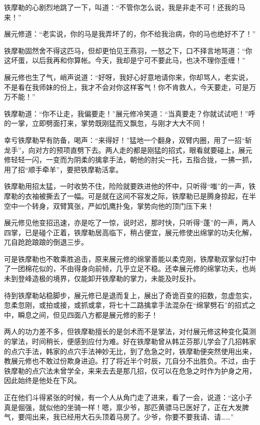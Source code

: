 \documentclass[12pt,oneside]{book}
\begin{document}
铁摩勒的心剧烈地跳了一下，叫道：``不管你怎么说，我是非走不可！还我的马来！''

展元修道：``老实说，你的马是我弄坏了的，你不给我治病，你的马也绝好不了！''

铁摩勒固然舍不得这匹马，但却更怕见王燕羽，一怒之下，口不择言地骂道：``你这坏蛋，以后我再和你算帐。今天，我却是宁可不要此马，也决不理你歪缠！''

展元修也生了气，峭声说道：``好呀，我好心好意地请你来，你却骂人，老实说，不是看在我师妹的份上，我才不会对你这样客气！你不肯救人，今天要走，可是万万不能！''

铁摩勒道：``你不让走，我偏要走！''展元修冷笑道：``当真要走？你就试试吧！''呼的一掌，立即劈面打来，掌势既刚猛而又飘忽，与刚才大大不同！

幸亏铁摩勒早有防备，喝声：``来得好！''猛地一个翻身，双臂内圈，用了一招``斩龙手''，向对方的预项直劈下去。两人走的都是刚猛的招式，眼看就要碰上，展元修轻轻一闪，一变而为阴柔的擒拿手法，朝他的肘尖一托，五指合拢，一拂一抓，用了招``顺手牵羊''，要把铁摩勒活拿。

铁摩勒用招太猛，一时收势不住，险险就要跌进他的怀中，只听得``嗤''的一声，铁摩勒的衣袖被撕去了一幅。可是就在这间不容发之际，铁摩勒已是腾身掠起，在半空中一个转身，双臂箕张，严如饥鹰扑兔，掌势向他的顶门压下来！

展元修见他变招迅速，亦是吃了一惊，说时迟，那时快，只听得``蓬''的一声，两人四掌，已是碰个正着，铁摩勒居高临下，稍占便宜，展元修使出绵掌的功夫化解，兀自跄跄踉踉的倒退三步。

可是铁摩勒也不敢乘胜追击，原来展元修的绵掌善能以柔克刚，铁摩勒双掌似打中了一团棉花似的，不由得身向前倾，几乎立足不稳。还幸展元修的绵掌功夫，也尚未到登峰造极的境界，仅能卸开铁摩勒的掌力，未能及时反扑。

待到铁摩勒站稳脚步，展元修已是退而复上，展出了奇诡百变的招数，忽虚忽实，忽柔忽刚，或拍或接，或抓或拿，将七十二路擒拿手法混杂在``绵掌劈石''的招式之中，瞬息之间，但见四面八方都是展元修的影子！

两人的功力差不多，但铁摩勒擅长的是剑术而不是掌法，对付展元修这种变化莫测的掌法，时间稍长，便感到应付为难。好在铁摩勒曾从韩芷芬那儿学会了几招韩家的点穴手法，韩家的点穴手法神妙无比，到了危急之时，铁摩勒便突然使用出来，教展元修也不敢过份欺身进迫。打了将近半个时辰，兀自分不出胜负。不过，由于铁摩勒的点穴法未曾学全，来来去去是那几招，仅可以在危急之时作为护身之用，因此始终是他处在下风。

正在他们斗得紧张的时候，有一个人从角门走了进来，看了一会，说道：``这小子真是倔强，就似他的坐骑一样！嗯，禀少爷，那匹黄骠马已医好了，正在大发脾气，要闯出来，我已经用大石头顶着马房了。少爷，你要不要我请、请\ldots\ldots{}''
\end{document}
